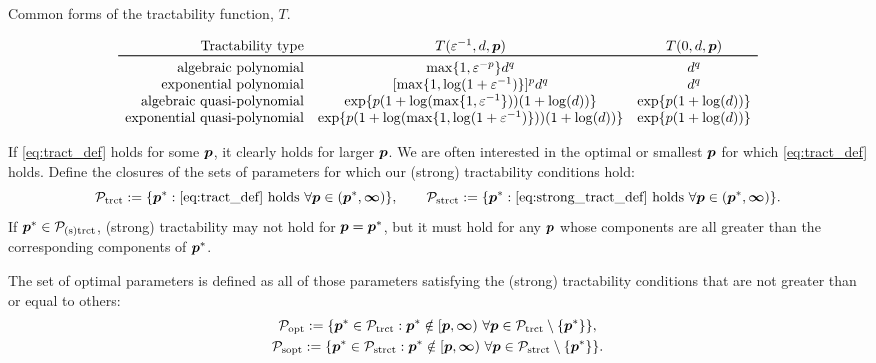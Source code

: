 \documentclass[sort&compress]{elsarticle}
\begin{document}
\begin{table}
    \caption{Common forms of the tractability function, $T$.}
{\small
\begin{equation*}
	\begin{array}{r@{\quad}c@{\quad}cc}
		\text{Tractability type} & T(\varepsilon^{-1},d,\vp)
		& T(0,d,\vp)\\
		\toprule
		\text{algebraic polynomial} & \max\{1,\varepsilon^{-p}\}d^{q} & d^{q}\\
		\text{exponential polynomial} &
		[\max\{1,\log(1 + \varepsilon^{-1})\}]^p  d^{q} & d^{q} \\
        \text{algebraic quasi-polynomial} &
        \exp\{p(1+\log(\max\{1, \varepsilon^{-1}\}))(1+\log(d))\} &
        \exp\{p(1+\log(d))\}\\
        \text{exponential quasi-polynomial} &
        \exp\{p(1+\log(\max\{1,\log(1+\varepsilon^{-1})\}))(1+\log(d))\} &
        \exp\{p(1+\log(d))\}
	\end{array}
\end{equation*}}
\label{tab:commonT}
\end{table}

If \eqref{eq:tract_def} holds for some $\boldsymbol{p}$, it clearly holds for larger $\boldsymbol{p}$.  We are often interested in the optimal or smallest $\boldsymbol{p}$ for which \eqref{eq:tract_def} holds.  Define the closures of the sets of parameters for which our (strong) tractability conditions hold:
\begin{equation*}
	\mathcal{P}_{\textup{trct}} : = \{\boldsymbol{p}^* : \eqref{eq:tract_def} \text{ holds }\forall \boldsymbol{p} \in (\boldsymbol{p}^*,\boldsymbol{\infty})\}, \qquad
	\mathcal{P}_{\textup{strct}} : = \{\boldsymbol{p}^* : \eqref{eq:strong_tract_def} \text{ holds }\forall \boldsymbol{p} \in (\boldsymbol{p}^*,\boldsymbol{\infty})\}.
\end{equation*}
If $\boldsymbol{p}^* \in \mathcal{P}_{\textup{(s)trct}}$, (strong) tractability may not hold for $\boldsymbol{p} = \boldsymbol{p}^*$, but it must hold for any $\boldsymbol{p}$ whose components are all greater than the corresponding components of $\boldsymbol{p}^*$.

\begin{definition}
    The  set of optimal parameters is defined as all of those parameters satisfying the (strong) tractability conditions that are not greater than or equal to others:
\begin{gather}
	\label{eq:Poptdef}
	\mathcal{P}_{\textup{opt}} : = \{\boldsymbol{p}^* \in \mathcal{P}_{\textup{trct}} :  \boldsymbol{p}^* \notin [\boldsymbol{p},\boldsymbol{\infty}) \ \forall \boldsymbol{p} \in  \mathcal{P}_{\textup{trct}} \setminus \{\boldsymbol{p}^*\} \}, \\
	\label{eq:Psoptdef}
	\mathcal{P}_{\textup{sopt}} : = \{\boldsymbol{p}^* \in \mathcal{P}_{\textup{strct}} :  \boldsymbol{p}^* \notin [\boldsymbol{p},\boldsymbol{\infty}) \ \forall \boldsymbol{p} \in  \mathcal{P}_{\textup{strct}} \setminus \{\boldsymbol{p}^*\} \}.
\end{gather}
\end{definition}
\end{document}
